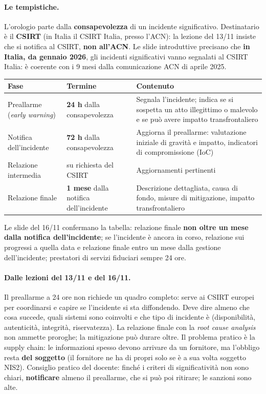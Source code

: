 \paragraph{Le tempistiche.} L'orologio parte dalla \textbf{consapevolezza} di un incidente
significativo. Destinatario è il \textbf{CSIRT} (in Italia il CSIRT Italia, presso l'ACN): la lezione del
13/11 insiste che si notifica al CSIRT, \textbf{non all'ACN}. Le slide introduttive precisano che
\textbf{in Italia, da gennaio 2026}, gli incidenti significativi vanno segnalati al CSIRT Italia: è
coerente con i 9 mesi dalla comunicazione ACN di aprile 2025.

\begin{center}
\small
\begin{tabularx}{\linewidth}{>{\raggedright\arraybackslash}p{3.2cm} >{\raggedright\arraybackslash}p{3.6cm} X}
\toprule
\textbf{Fase} & \textbf{Termine} & \textbf{Contenuto} \\ \midrule
Preallarme (\emph{early warning}) & \textbf{24 h} dalla consapevolezza
  & Segnala l'incidente; indica se si sospetta un atto illegittimo o malevolo e se può avere impatto
    transfrontaliero \\
Notifica dell'incidente & \textbf{72 h} dalla consapevolezza
  & Aggiorna il preallarme: valutazione iniziale di gravità e impatto, indicatori di compromissione
    (IoC) \\
Relazione intermedia & su richiesta del CSIRT & Aggiornamenti pertinenti \\
Relazione finale & \textbf{1 mese} dalla notifica dell'incidente
  & Descrizione dettagliata, causa di fondo, misure di mitigazione, impatto transfrontaliero \\
\bottomrule
\end{tabularx}
\end{center}

Le slide del 16/11 confermano la tabella: relazione finale \textbf{non oltre un mese dalla notifica
dell'incidente}; se l'incidente è ancora in corso, relazione sui progressi a quella data e relazione
finale entro un mese dalla gestione dell'incidente; prestatori di servizi fiduciari sempre 24 ore.

\paragraph{Dalle lezioni del 13/11 e del 16/11.} Il preallarme a 24 ore non richiede un quadro completo: serve ai
CSIRT europei per coordinarsi e capire se l'incidente si sta diffondendo. Deve dire almeno che cosa
succede, quali sistemi sono coinvolti e che tipo di incidente è (disponibilità, autenticità, integrità,
riservatezza). La relazione finale con la \emph{root cause analysis} non ammette proroghe; la
mitigazione può durare oltre. Il problema pratico è la supply chain: le informazioni spesso devono
arrivare da un fornitore, ma l'obbligo resta \textbf{del soggetto} (il fornitore ne ha di propri solo se
è a sua volta soggetto NIS2). Consiglio pratico del docente: finché i criteri di significatività non
sono chiari, \textbf{notificare} almeno il preallarme, che si può poi ritirare; le sanzioni sono alte.

